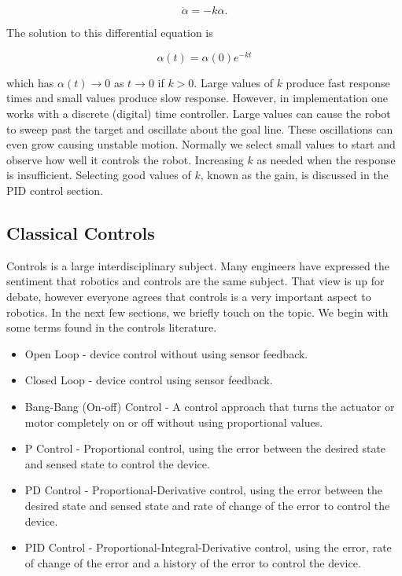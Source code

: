 \[\dot{\alpha} = -k\alpha.\]

The solution to this differential equation is

\[\alpha(t) = \alpha(0) e^{-kt}\]

which has \(\alpha(t) \to 0\) as \(t\to 0\) if \(k>0\). Large values of
\(k\) produce fast response times and small values produce slow
response. However, in implementation one works with a discrete (digital)
time controller. Large values can cause the robot to sweep past the
target and oscillate about the goal line. These oscillations can even
grow causing unstable motion. Normally we select small values to start
and observe how well it controls the robot. Increasing \(k\) as needed
when the response is insufficient. Selecting good values of \(k\), known
as the gain, is discussed in the PID control section.

\hypertarget{classical-controls}{%
\subsection{Classical Controls}\label{classical-controls}}

Controls is a large interdisciplinary subject. Many engineers have
expressed the sentiment that robotics and controls are the same subject.
That view is up for debate, however everyone agrees that controls is a
very important aspect to robotics. In the next few sections, we briefly
touch on the topic. We begin with some terms found in the controls
literature.

\begin{itemize}
\tightlist
\item
  Open Loop - device control without using sensor feedback.
\item
  Closed Loop - device control using sensor feedback.
\item
  Bang-Bang (On-off) Control - A control approach that turns the
  actuator or motor completely on or off without using proportional
  values.
\item
  P Control - Proportional control, using the error between the desired
  state and sensed state to control the device.
\item
  PD Control - Proportional-Derivative control, using the error between
  the desired state and sensed state and rate of change of the error to
  control the device.
\item
  PID Control - Proportional-Integral-Derivative control, using the
  error, rate of change of the error and a history of the error to
  control the device.
\end{itemize}

